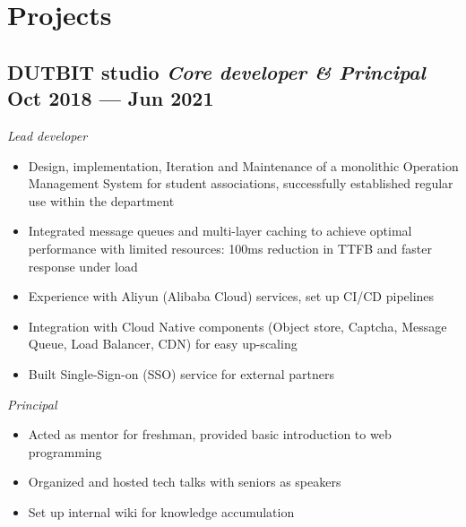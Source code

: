 \documentclass[a4,12pt]{article}
\newcommand{\subtext}[1]{
#1\par\vspace{-0.2cm}}
\newenvironment{zitemize}{
\begin{itemize}\itemsep0pt \parskip0pt \parsep1pt}
{\end{itemize}\vspace{-0.5cm}}
\begin{document}


\section{\textbf{Projects}} %



\subsection*{DUTBIT studio {\normalsize\normalfont \textit{Core developer \& Principal}} \hfill  Oct 2018 --- Jun 2021} 
\subtext{\textit{Lead developer}}
    \begin{zitemize}
        \item Design, implementation, Iteration and Maintenance of a monolithic Operation Management System for student associations, successfully established regular use within the department
        \item Integrated message queues and multi-layer caching to achieve optimal performance with limited resources: 100ms reduction in TTFB and faster response under load
        \item Experience with Aliyun (Alibaba Cloud) services, set up CI/CD pipelines
        \item Integration with Cloud Native components (Object store, Captcha, Message Queue, Load Balancer, CDN) for easy up-scaling
        \item Built Single-Sign-on (SSO) service for external partners 
    \end{zitemize}
\vspace{0.3cm}
\subtext{\textit{Principal}}
\begin{zitemize}
    \item Acted as mentor for freshman, provided basic introduction to web programming
    \item Organized and hosted tech talks with seniors as speakers
    \item Set up internal wiki for knowledge accumulation
\end{zitemize}
\end{document}
